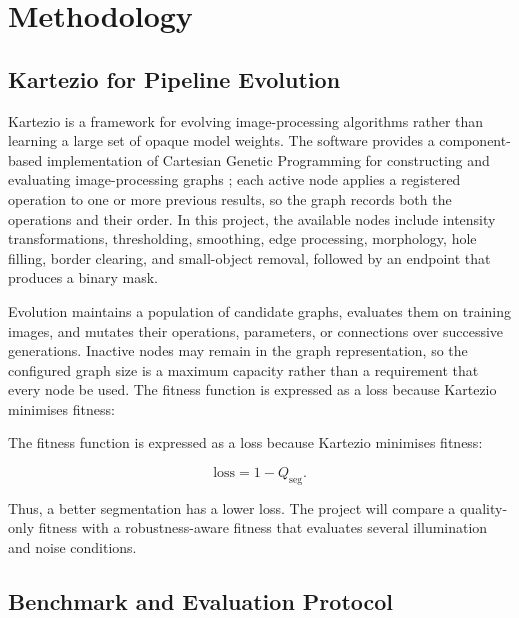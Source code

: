 \documentclass[11pt,a4paper]{article}
\begin{document}
\section{Methodology}
\label{sec:methodology}

\subsection{Kartezio for Pipeline Evolution}

Kartezio is a framework for evolving image-processing algorithms rather than learning a large set of opaque model weights. The software provides a component-based implementation of Cartesian Genetic Programming for constructing and evaluating image-processing graphs \cite{cortacero2023,miller2020,margraf2023}; each active node applies a registered operation to one or more previous results, so the graph records both the operations and their order. In this project, the available nodes include intensity transformations, thresholding, smoothing, edge processing, morphology, hole filling, border clearing, and small-object removal, followed by an endpoint that produces a binary mask.

Evolution maintains a population of candidate graphs, evaluates them on training images, and mutates their operations, parameters, or connections over successive generations. Inactive nodes may remain in the graph representation, so the configured graph size is a maximum capacity rather than a requirement that every node be used. The fitness function is expressed as a loss because Kartezio minimises fitness:

The fitness function is expressed as a loss because Kartezio minimises fitness:

\begin{equation}
    \mathrm{loss}=1-Q_{\mathrm{seg}}.
\end{equation}

Thus, a better segmentation has a lower loss. The project will compare a quality-only fitness with a robustness-aware fitness that evaluates several illumination and noise conditions.

\subsection{Benchmark and Evaluation Protocol}
\label{sec:protocol}
\end{document}
